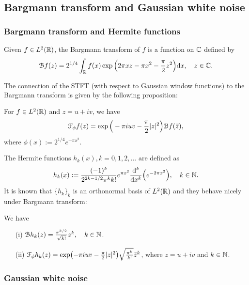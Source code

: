 \subsection{Bargmann transform and Gaussian white noise}
\subsubsection{Bargmann transform and Hermite functions}
\begin{definition}
Given $f\in L^2(\mathbb{R})$, the Bargmann transform of $f$ is a function on $\mathbb{C}$ defined by
\[ \mathcal Bf(z) = 2^{1/4} \int_{\mathbb{R}} f(x) \exp \Big ( 2\pi x z - \pi x^2 - \frac{\pi}{2} z^2 \Big ) \mathrm{d} x, \quad z\in \mathbb{C}.\]
\end{definition}

The connection of the STFT (with respect to Gaussian window functions) to the Bargmann transform is given by the following proposition:  

\begin{proposition}
For $f\in L^2(\mathbb{R})$ and $z= u+iv$, we have 
\[ \mathcal{F}_\phi f (z) = \exp \Big ( -\pi i u v - \frac{\pi}{2} |z|^2 \Big ) \mathcal B f(\bar z), \]
where $\phi (x) := 2^{1/4}e^{-\pi x^2}$.
\end{proposition}

The Hermite functions $h_k(x), k=0,1,2,\ldots$ are defined as 
\begin{equation} \label{eq:hermite}
 h_k(x) := \frac{(-1)^k}{2^{2k-1/2} \pi^k k!} e^{\pi x^2} \frac{ \mathrm{d}^k}{\mathrm{d} x^k} \Big (e^{-2\pi x^2} \Big ), \quad k \in \mathbb{N}.
\end{equation}
It is known that $\{h_k\}_k$ is an orthonormal basis of $L^2(\mathbb{R})$ and they behave nicely under Bargmann transform:

\begin{proposition} \label{p:Bargmann}
We have
\begin{enumerate}
\item[(i)] $ \mathcal Bh_k(z) = \frac{\pi^{k/2}}{\sqrt{k!}} z^k , \quad k\in \mathbb{N}$.
\item[(ii)] $\mathcal{F}_\phi h_k (z) = \exp  (-\pi i uv - \frac{\pi}{2} |z|^2  ) \sqrt{\frac{\pi^k}{k!}} \bar{z}^k$, where $z= u+iv$ and $k\in \mathbb{N}$.
\end{enumerate}
\end{proposition}

\subsubsection{Gaussian white noise}

